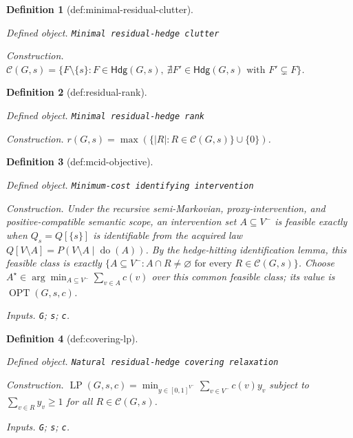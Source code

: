 \documentclass{article}
\newtheorem{definition}{Definition}
\begin{document}
\begin{definition}[def:minimal-residual-clutter]\label{def:minimal-residual-clutter}
\par\smallskip\noindent\emph{Defined object.} \texttt{Minimal residual-\allowbreak{}hedge clutter}
\par\smallskip\noindent\emph{Construction.} \(\mathcal C(G,s)=\{F\setminus\{s\}:F\in\mathsf{Hdg}(G,s),\ \nexists F'\in\mathsf{Hdg}(G,s)\text{ with }F'\subsetneq F\}\).
\end{definition}

\begin{definition}[def:residual-rank]\label{def:residual-rank}
\par\smallskip\noindent\emph{Defined object.} \texttt{Minimal residual-\allowbreak{}hedge rank}
\par\smallskip\noindent\emph{Construction.} \(r(G,s)=\max(\{|R|:R\in\mathcal C(G,s)\}\cup\{0\})\).
\end{definition}

\begin{definition}[def:mcid-objective]\label{def:mcid-objective}
\par\smallskip\noindent\emph{Defined object.} \texttt{Minimum-\allowbreak{}cost identifying intervention}
\par\smallskip\noindent\emph{Construction.} Under the recursive semi-Markovian, proxy-intervention, and positive-compatible semantic scope, an intervention set \(A\subseteq V^{-}\) is feasible exactly when \(Q_s=Q[\{s\}]\) is identifiable from the acquired law \(Q[V\setminus A]=P(V\setminus A\mid\operatorname{do}(A))\). By the hedge-hitting identification lemma, this feasible class is exactly \(\{A\subseteq V^{-}:A\cap R\neq\varnothing\text{ for every }R\in\mathcal C(G,s)\}\). Choose \(A^\star\in\arg\min_{A\subseteq V^{-}}\sum_{v\in A}c(v)\) over this common feasible class; its value is \(\operatorname{OPT}(G,s,c)\).
\par\smallskip\noindent\emph{Inputs.} \texttt{G}; \texttt{s}; \texttt{c}.
\end{definition}

\begin{definition}[def:covering-lp]\label{def:covering-lp}
\par\smallskip\noindent\emph{Defined object.} \texttt{Natural residual-\allowbreak{}hedge covering relaxation}
\par\smallskip\noindent\emph{Construction.} \(\operatorname{LP}(G,s,c)=\min_{y\in[0,1]^{V^{-}}}\sum_{v\in V^{-}}c(v)y_v\) subject to \(\sum_{v\in R}y_v\geq1\) for all \(R\in\mathcal C(G,s)\).
\par\smallskip\noindent\emph{Inputs.} \texttt{G}; \texttt{s}; \texttt{c}.
\end{definition}
\end{document}
